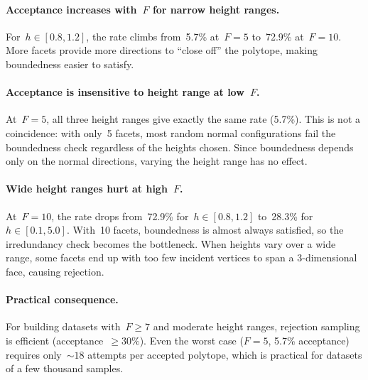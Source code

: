 \paragraph{Acceptance increases with~$F$ for narrow height ranges.}
For~$h \in [0.8, 1.2]$, the rate climbs from~5.7\% at~$F = 5$ to~72.9\%
at~$F = 10$. More facets provide more directions to ``close off'' the
polytope, making boundedness easier to satisfy.

\paragraph{Acceptance is insensitive to height range at low~$F$.}
At~$F = 5$, all three height ranges give exactly the same rate (5.7\%).
This is not a coincidence: with only~5 facets, most random normal
configurations fail the boundedness check regardless of the heights chosen.
Since boundedness depends only on the normal directions, varying the height
range has no effect.

\paragraph{Wide height ranges hurt at high~$F$.}
At~$F = 10$, the rate drops from~72.9\% for~$h \in [0.8, 1.2]$ to~28.3\%
for~$h \in [0.1, 5.0]$. With~10 facets, boundedness is almost always
satisfied, so the irredundancy check becomes the bottleneck. When heights vary
over a wide range, some facets end up with too few incident vertices to span
a 3-dimensional face, causing rejection.

\paragraph{Practical consequence.}
For building datasets with~$F \ge 7$ and moderate height ranges, rejection
sampling is efficient (acceptance~$\ge 30\%$). Even the worst case ($F = 5$,
5.7\% acceptance) requires only~${\sim}18$ attempts per accepted polytope,
which is practical for datasets of a few thousand samples.
